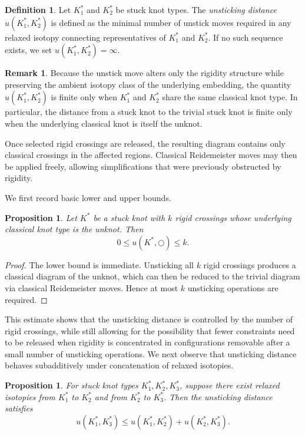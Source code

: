 \documentclass[11pt,a4paper]{article}
\theoremstyle{plain}
\newtheorem{proposition}[theorem]{Proposition}
\theoremstyle{definition}
\newtheorem{definition}[theorem]{Definition}
\newtheorem{remark}[theorem]{Remark}
\begin{document}
\begin{definition}
Let $K_1^*$ and $K_2^*$ be stuck knot types. The \emph{unsticking distance} $u(K_1^*,K_2^*)$ is defined as the minimal number of unstick moves required in any relaxed isotopy connecting representatives of $K_1^*$ and $K_2^*$. If no such sequence exists, we set $u(K_1^*,K_2^*)=\infty$.
\end{definition}

\begin{remark}
Because the unstick move alters only the rigidity structure while preserving the ambient isotopy class of the underlying embedding, the quantity $u(K_1^*,K_2^*)$ is finite only when $K_1^*$ and $K_2^*$ share the same classical knot type. In particular, the distance from a stuck knot to the trivial stuck knot is finite only when the underlying classical knot is itself the unknot.
\end{remark}

Once selected rigid crossings are released, the resulting diagram contains only classical crossings in the affected regions. Classical Reidemeister moves may then be applied freely, allowing simplifications that were previously obstructed by rigidity.

We first record basic lower and upper bounds.

\begin{proposition}
Let $K^*$ be a stuck knot with $k$ rigid crossings whose underlying classical knot type is the unknot. Then
\[
0 \le u(K^*,\bigcirc) \le k.
\]
\end{proposition}

\begin{proof}
The lower bound is immediate. Unsticking all $k$ rigid crossings produces a classical diagram of the unknot, which can then be reduced to the trivial diagram via classical Reidemeister moves. Hence at most $k$ unsticking operations are required.
\end{proof}


This estimate shows that the unsticking distance is controlled by the number of rigid crossings, while still allowing for the possibility that fewer constraints need to be released when rigidity is concentrated in configurations removable after a small number of unsticking operations. We next observe that unsticking distance behaves subadditively under concatenation of relaxed isotopies.


\begin{proposition}
For stuck knot types $K_1^*, K_2^*, K_3^*$, suppose there exist relaxed isotopies from $K_1^*$ to $K_2^*$ and from $K_2^*$ to $K_3^*$. Then the unsticking distance satisfies
\[
u(K_1^*,K_3^*) \le u(K_1^*,K_2^*) + u(K_2^*,K_3^*).
\]
\end{proposition}
\end{document}
